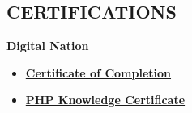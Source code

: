 \documentclass[margin]{res}
\begin{document}
\begin{resume}
  \section{CERTIFICATIONS}
  \hspace{4mm}
  {\bf Digital Nation}
  \begin{itemize}
    \item \href{https://drive.google.com/file/d/15JN-Ko_CXP_WKGsrRxdQNzniaNkSrgTx/view}{\textbf{Certificate of Completion}}
    \item \href{https://drive.google.com/file/d/1Ahga9TNBsfRH_j3DBIsywD5D3XRbzElf/view}{\textbf{PHP Knowledge Certificate}}
  \end{itemize}
\end{resume}
\end{document}
